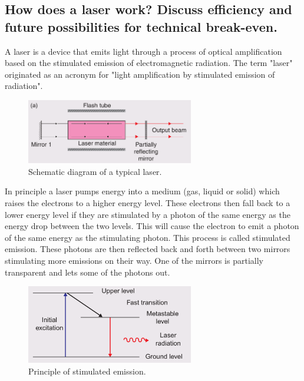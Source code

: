 \subsection{How does a laser work? Discuss efficiency and future possibilities for technical break-even.}
\begin{multisolutionblock}
    A laser is a device that emits light through a process of optical amplification based on the stimulated emission of electromagnetic radiation. The term "laser" originated as an acronym for "light amplification by stimulated emission of radiation".\\
    \begin{figure}[H]
        \centering
        \includegraphics[width=0.65\textwidth]{chapters/fig/7_laser_schematics.png}
        \caption{Schematic diagram of a typical laser.}
        \label{fig:7_laser}
    \end{figure}
    In principle a laser pumps energy into a medium (gas, liquid or solid) which raises the electrons to a higher energy level. These electrons then fall back to a lower energy level if they are stimulated by a photon of the same energy as the energy drop between the two levels. This will cause the electron to emit a photon of the same energy as the stimulating photon. This process is called stimulated emission. These photons are then reflected back and forth between two mirrors stimulating more emissions on their way. One of the mirrors is partially transparent and lets some of the photons out. \\

    \begin{figure}[H]
        \centering
        \includegraphics[width=0.65\textwidth]{chapters/fig/7_laser_principle.png}
        \caption{Principle of stimulated emission.}
        \label{fig:7_laser_principle}
    \end{figure}


\end{multisolutionblock}
